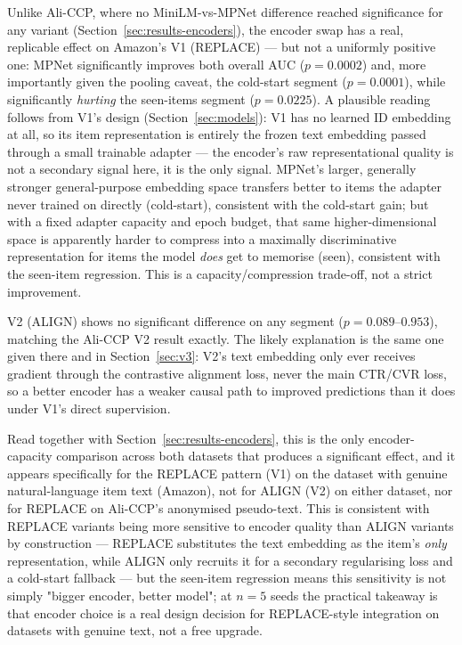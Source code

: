 Unlike Ali-CCP, where no MiniLM-vs-MPNet difference reached significance for any variant (Section~\ref{sec:results-encoders}), the encoder swap has a real, replicable effect on Amazon's V1 (REPLACE) --- but not a uniformly positive one: MPNet significantly improves both overall AUC ($p=0.0002$) and, more importantly given the pooling caveat, the cold-start segment ($p=0.0001$), while significantly \emph{hurting} the seen-items segment ($p=0.0225$). A plausible reading follows from V1's design (Section~\ref{sec:models}): V1 has no learned ID embedding at all, so its item representation is entirely the frozen text embedding passed through a small trainable adapter --- the encoder's raw representational quality is not a secondary signal here, it is the only signal. MPNet's larger, generally stronger general-purpose embedding space transfers better to items the adapter never trained on directly (cold-start), consistent with the cold-start gain; but with a fixed adapter capacity and epoch budget, that same higher-dimensional space is apparently harder to compress into a maximally discriminative representation for items the model \emph{does} get to memorise (seen), consistent with the seen-item regression. This is a capacity/compression trade-off, not a strict improvement.

V2 (ALIGN) shows no significant difference on any segment ($p=0.089$--$0.953$), matching the Ali-CCP V2 result exactly. The likely explanation is the same one given there and in Section~\ref{sec:v3}: V2's text embedding only ever receives gradient through the contrastive alignment loss, never the main CTR/CVR loss, so a better encoder has a weaker causal path to improved predictions than it does under V1's direct supervision.

Read together with Section~\ref{sec:results-encoders}, this is the only encoder-capacity comparison across both datasets that produces a significant effect, and it appears specifically for the REPLACE pattern (V1) on the dataset with genuine natural-language item text (Amazon), not for ALIGN (V2) on either dataset, nor for REPLACE on Ali-CCP's anonymised pseudo-text. This is consistent with REPLACE variants being more sensitive to encoder quality than ALIGN variants by construction --- REPLACE substitutes the text embedding as the item's \emph{only} representation, while ALIGN only recruits it for a secondary regularising loss and a cold-start fallback --- but the seen-item regression means this sensitivity is not simply "bigger encoder, better model"; at $n=5$ seeds the practical takeaway is that encoder choice is a real design decision for REPLACE-style integration on datasets with genuine text, not a free upgrade.

